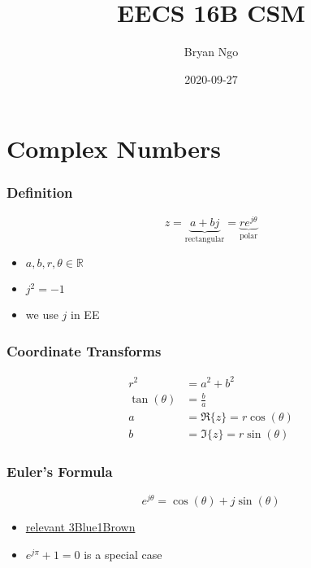 \documentclass[aspectratio=169]{beamer}
\title{EECS 16B CSM}
\author{Bryan Ngo}
\date{2020-09-27}
\institute{Computer Science Mentors}
\newcommand{\R}{\mathbb{R}}
\begin{document}
\begin{frame}
    \maketitle
\end{frame}

\begin{frame}
    \tableofcontents
\end{frame}

\section{Complex Numbers}

\begin{frame}
    \frametitle{Definition}

    \begin{equation}
        z = \underbrace{a + bj}_{\text{rectangular}} = \underbrace{r e^{j \theta}}_{\text{polar}}
    \end{equation}
    \begin{itemize}
        \item \(a, b, r, \theta \in \R\)
        \item \(j^2 = -1\)
        \item we use \(j\) in EE
    \end{itemize}
\end{frame}

\begin{frame}
    \frametitle{Coordinate Transforms}

    \begin{align}
        r^2 &= a^2 + b^2 \\
        \tan(\theta) &= \frac{b}{a} \\
        a &= \Re\{z\} = r \cos(\theta) \\
        b &= \Im\{z\} = r \sin(\theta)
    \end{align}
\end{frame}

\begin{frame}
    \frametitle{Euler's Formula}

    \begin{equation}
        e^{j \theta} = \cos(\theta) + j \sin(\theta)
    \end{equation}
    \begin{itemize}
        \item \href{https://youtu.be/v0YEaeIClKY}{relevant 3Blue1Brown}
        \item \(e^{j \pi} + 1 = 0\) is a special case
    \end{itemize}
\end{frame}
\end{document}
